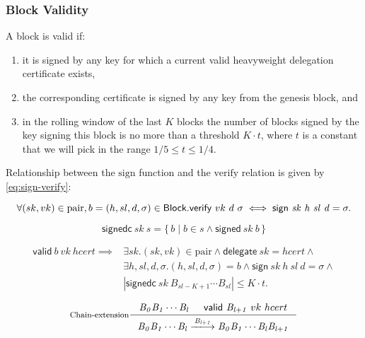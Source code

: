 \documentclass[11pt,a4paper]{article}
\newcommand\Set[2]{\{\,#1\mid#2\,\}}
\newcommand{\var}[1]{\mathit{#1}}
\newcommand{\fun}[1]{\mathsf{#1}}
\newcommand{\type}[1]{\mathsf{#1}}
\newcommand{\trans}[2]{\xlongrightarrow[\textsc{#1}]{#2}}
\newcommand{\Block}{\type{Block}}
\newcommand{\signname}{sign}
\newcommand{\signedname}{signed}
\newcommand{\signedseqname}{signedc}
\newcommand{\verifyname}{verify}
\newcommand{\delegatename}{delegate}
\newcommand{\validname}{valid}
\newcommand{\keypairname}{pair}
\newcommand{\sign}[4]{\fun{\signname}\ \var{#1} ~ \var{#2} ~ \var{#3} ~ \var{#4}}
\newcommand{\signed}[2]{\fun{\signedname}\ \var{#1} ~ \var{#2}}
\newcommand{\signedwindow}[2]{\fun{\signedseqname}\ \var{#1} ~ \var{#2}}
\newcommand{\verify}[3]{\fun{\verifyname} ~ #1 ~ #2 ~ #3}
\newcommand{\delegate}[1]{\fun{\delegatename}\ \var{#1}}
\newcommand{\valid}[3]{\fun{\validname} ~ #1 ~ #2 ~ #3}
\begin{document}
\subsubsection{Block Validity}
\label{sec:block-valid}
A block is valid if:
\begin{enumerate}
\item it is signed by any key for which a current valid heavyweight delegation
  certificate exists,
\item the corresponding certificate is signed by any key from the genesis
  block, and
\item in the rolling window of the last $K$ blocks the number of blocks signed
  by the key signing this block is no more than a threshold $K \cdot t$, where
  $t$ is a constant that we will pick in the range $1/5 \leq t \leq 1/4$.
\end{enumerate}


Relationship between the $\text{\signname}$ function and the
$\text{\verifyname}$ relation is given by \eqref{eq:sign-verify}:

\begin{equation}
  \label{eq:sign-verify}
  \forall (sk, vk) \in \text{\keypairname}, b = (h, sl, d, \sigma) \in \Block.\\
  \verify{vk}{d}{\sigma} \iff \sign{sk}{h}{sl}{d} = \sigma.
\end{equation}

\begin{equation}
  \label{eq:signed-window}
  \signedwindow{sk}{s} = \Set{b}{b \in s \wedge \signed{sk}{b}}
\end{equation}

\begin{align}
  \label{eq:valid-block}
    \valid{b}{vk}{hcert} \implies &
      \exists sk. (sk, vk) \in \text{\keypairname} \wedge
      \delegate{sk} = hcert \wedge \\
      & \exists h, sl, d, \sigma. (h, sl, d, \sigma) = b \wedge
        \sign{sk}{h}{sl}{d} = \sigma \wedge \\
      & | \signedwindow{sk}{\var{B_{sl-K+1}} \cdots \var{B_{sl}}} | \leq K \cdot t.
\end{align}

\begin{equation}
  \label{eq:chain-extension}
  \inference[Chain-extension]
  {\var{B_0}\var{B_1}\cdots\var{B_l} & \valid{\var{B_{l+1}}}{vk}{hcert}
  }
  {{\var{B_0}\var{B_1}\cdots\var{B_l}} \trans{}{\var{B_{l+1}}} {\var{B_0}\var{B_1}\cdots\var{B_l}\var{B_{l+1}}}}
\end{equation}
\end{document}
